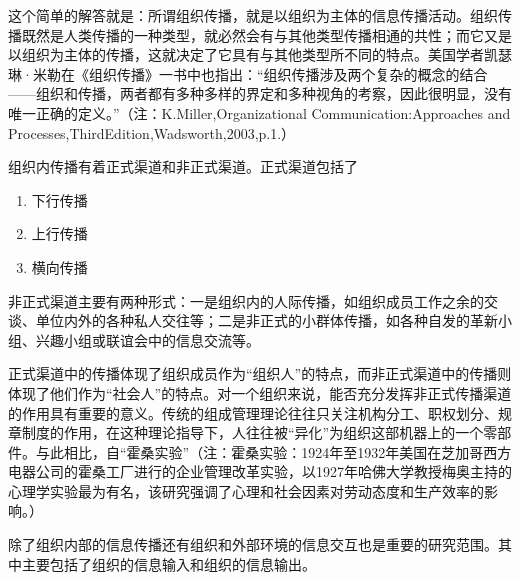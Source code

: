 \documentclass[UTF8,12pt]{ctexart}
\numberwithin{equation}{section} %
\numberwithin{figure}{section}
\numberwithin{table}{section}
\begin{document}
	这个简单的解答就是：所谓组织传播，就是以组织为主体的信息传播活动。组织传播既然是人类传播的一种类型，就必然会有与其他类型传播相通的共性；而它又是以组织为主体的传播，这就决定了它具有与其他类型所不同的特点。美国学者凯瑟琳·米勒在《组织传播》一书中也指出：“组织传播涉及两个复杂的概念的结合——组织和传播，两者都有多种多样的界定和多种视角的考察，因此很明显，没有唯一正确的定义。”（注：K.Miller,Organizational Communication:Approaches and Processes,ThirdEdition,Wadsworth,2003,p.1.）
	
	组织内传播有着正式渠道和非正式渠道。正式渠道包括了
	\begin{enumerate}
		\item 下行传播
		
		\item 上行传播
		
		\item 横向传播
	\end{enumerate}
	
	非正式渠道主要有两种形式：一是组织内的人际传播，如组织成员工作之余的交谈、单位内外的各种私人交往等；二是非正式的小群体传播，如各种自发的革新小组、兴趣小组或联谊会中的信息交流等。
	
	正式渠道中的传播体现了组织成员作为“组织人”的特点，而非正式渠道中的传播则体现了他们作为“社会人”的特点。对一个组织来说，能否充分发挥非正式传播渠道的作用具有重要的意义。传统的组成管理理论往往只关注机构分工、职权划分、规章制度的作用，在这种理论指导下，人往往被“异化”为组织这部机器上的一个零部件。与此相比，自“霍桑实验”（注：霍桑实验：1924年至1932年美国在芝加哥西方电器公司的霍桑工厂进行的企业管理改革实验，以1927年哈佛大学教授梅奥主持的心理学实验最为有名，该研究强调了心理和社会因素对劳动态度和生产效率的影响。）
	
	
	除了组织内部的信息传播还有组织和外部环境的信息交互也是重要的研究范围。其中主要包括了组织的信息输入和组织的信息输出。
	
\end{document}
